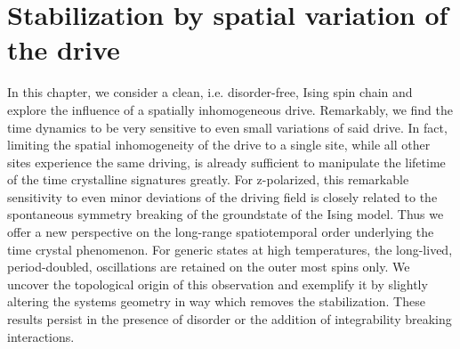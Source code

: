 \chapter{Stabilization by spatial variation of the drive}\label{ch:metronome-spin}

In this chapter, we consider a clean, i.e. disorder-free, Ising spin chain and explore the influence of a spatially inhomogeneous drive. Remarkably, we find the time dynamics to be very sensitive to even small variations of said drive. In fact, limiting the spatial inhomogeneity of the drive to a single site, while all other sites experience the same driving, is already sufficient to manipulate the lifetime of the time crystalline signatures greatly. For z-polarized, this remarkable sensitivity to even minor deviations of the driving field is closely related to the spontaneous symmetry breaking of the groundstate of the Ising model. Thus we offer a new perspective on the long-range spatiotemporal order underlying the time crystal phenomenon. For generic states at high temperatures, the long-lived, period-doubled, oscillations are retained on the outer most spins only. We uncover the topological origin of this observation and exemplify it by slightly altering the systems geometry in way which removes the stabilization. 
These results persist in the presence of disorder or the addition of integrability breaking interactions.

\newpage
{}
